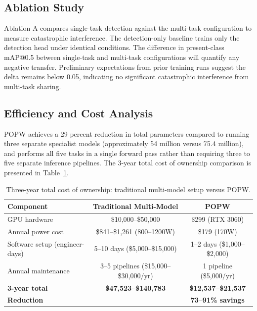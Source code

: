 \documentclass[10pt,twocolumn]{article}
\newcommand{\popw}{POPW}
\begin{document}
\subsection{Ablation Study}

Ablation A compares single-task detection against the multi-task configuration to measure catastrophic interference. The detection-only baseline trains only the detection head under identical conditions. The difference in present-class mAP@0.5 between single-task and multi-task configurations will quantify any negative transfer. Preliminary expectations from prior training runs suggest the delta remains below 0.05, indicating no significant catastrophic interference from multi-task sharing.

\subsection{Efficiency and Cost Analysis}

\popw{} achieves a 29 percent reduction in total parameters compared to running three separate specialist models (approximately 54 million versus 75.4 million), and performs all five tasks in a single forward pass rather than requiring three to five separate inference pipelines. The 3-year total cost of ownership comparison is presented in Table~\ref{tab:cost}.

\begin{table}[htbp]
\centering
\small
\caption{Three-year total cost of ownership: traditional multi-model setup versus \popw.}
\label{tab:cost}
\begin{tabular}{l c c}
\toprule
\textbf{Component} & \textbf{Traditional Multi-Model} & \textbf{\popw{}} \\
\midrule
GPU hardware & \$10,000--\$50,000 & \$299 (RTX 3060) \\
Annual power cost & \$841--\$1,261 (800--1200W) & \$179 (170W) \\
Software setup (engineer-days) & 5--10 days (\$5,000--\$15,000) & 1--2 days (\$1,000--\$2,000) \\
Annual maintenance & 3--5 pipelines (\$15,000--\$30,000/yr) & 1 pipeline (\$5,000/yr) \\
\midrule
\textbf{3-year total} & \textbf{\$47,523--\$140,783} & \textbf{\$12,537--\$21,537} \\
\textbf{Reduction} & & \textbf{73--91\% savings} \\
\bottomrule
\end{tabular}
\end{table}
\end{document}
